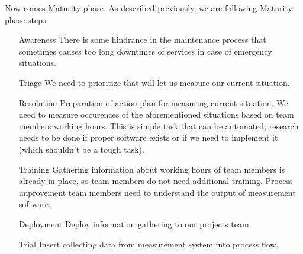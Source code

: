 Now comes Maturity phase. As described previously, we are following Maturity phase steps:
\begin{enumerate}
\item[Awareness] There is some hindrance in the maintenance process that sometimes causes too long downtimes of services in case of emergency situations. 
\item[Triage] We need to prioritize that will let us measure our current situation.
\item[Resolution] Preparation of action plan for measuring current situation. We need to measure occurences of the aforementioned situations based on team members working hours. This is simple task that can be automated, research needs to be done if proper software exists or if we need to implement it (which shouldn't be a tough task). 
\item[Training] Gathering information about working hours of team members is already in place, so team members do not need additional training. Process improvement team members need to understand the output of measurement software.
\item[Deployment] Deploy information gathering to our projects team.
\item[Trial] Insert collecting data from measurement system into process flow.
\end{enumerate}

